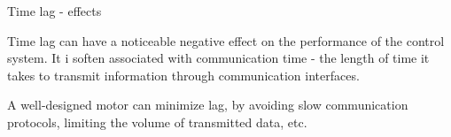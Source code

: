 \documentclass{beamer}
\begin{document}
\begin{frame}{Time lag - effects}
	\begin{flushleft}
		
		Time lag can have a noticeable negative effect on the performance of the control system. It i soften associated with communication time - the length of time it takes to transmit information through communication interfaces.
		
		\bigskip
		
		A well-designed motor can minimize lag, by avoiding slow communication protocols, limiting the volume of transmitted data, etc. 
		
	\end{flushleft}
\end{frame}


\myqrframe
\end{document}
